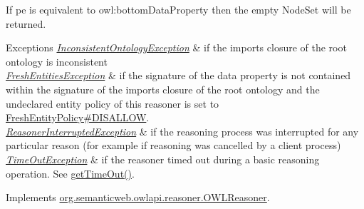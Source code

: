 If {\ttfamily pe} is equivalent to {\ttfamily owl\-:bottom\-Data\-Property} then the empty {\ttfamily Node\-Set} will be returned.


\begin{DoxyExceptions}{Exceptions}
{\em \hyperlink{classorg_1_1semanticweb_1_1owlapi_1_1reasoner_1_1_inconsistent_ontology_exception}{Inconsistent\-Ontology\-Exception}} & if the imports closure of the root ontology is inconsistent \\
\hline
{\em \hyperlink{classorg_1_1semanticweb_1_1owlapi_1_1reasoner_1_1_fresh_entities_exception}{Fresh\-Entities\-Exception}} & if the signature of the data property is not contained within the signature of the imports closure of the root ontology and the undeclared entity policy of this reasoner is set to \hyperlink{enumorg_1_1semanticweb_1_1owlapi_1_1reasoner_1_1_fresh_entity_policy_a762eae6d5b2449d125311ecaabfdc8d0}{Fresh\-Entity\-Policy\#\-D\-I\-S\-A\-L\-L\-O\-W}. \\
\hline
{\em \hyperlink{classorg_1_1semanticweb_1_1owlapi_1_1reasoner_1_1_reasoner_interrupted_exception}{Reasoner\-Interrupted\-Exception}} & if the reasoning process was interrupted for any particular reason (for example if reasoning was cancelled by a client process) \\
\hline
{\em \hyperlink{classorg_1_1semanticweb_1_1owlapi_1_1reasoner_1_1_time_out_exception}{Time\-Out\-Exception}} & if the reasoner timed out during a basic reasoning operation. See \hyperlink{classorg_1_1semanticweb_1_1owlapi_1_1reasoner_1_1impl_1_1_o_w_l_reasoner_base_af55342eaaabb1b72dacfde7a181b93d2}{get\-Time\-Out()}. \\
\hline
\end{DoxyExceptions}


Implements \hyperlink{interfaceorg_1_1semanticweb_1_1owlapi_1_1reasoner_1_1_o_w_l_reasoner_a2e3c782999b0ab23f85b80605a8dc3ca}{org.\-semanticweb.\-owlapi.\-reasoner.\-O\-W\-L\-Reasoner}.

